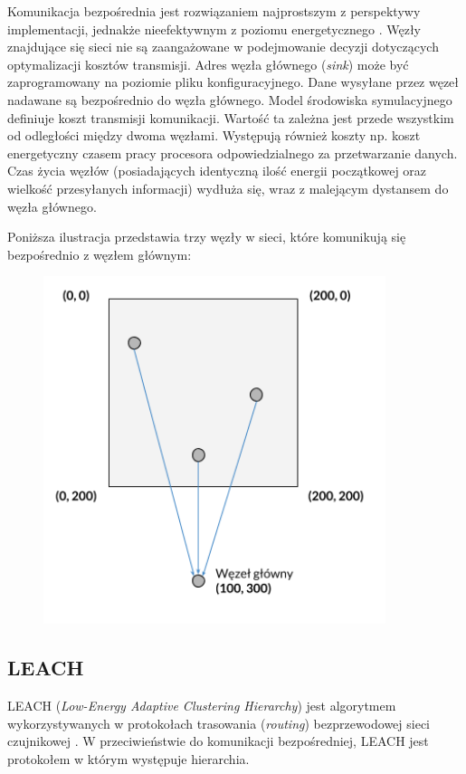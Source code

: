 \documentclass[a4paper,12pt,twoside,openany]{report}
\begin{document}
Komunikacja bezpośrednia jest rozwiązaniem najprostszym z perspektywy implementacji, jednakże nieefektywnym z poziomu energetycznego \cite{WSN-routing} \cite{Wiley-WSN}. 
Węzły znajdujące się sieci nie są zaangażowane w podejmowanie decyzji dotyczących optymalizacji kosztów transmisji. 
Adres węzła głównego (\textit{sink}) może być zaprogramowany na poziomie pliku konfiguracyjnego.
Dane wysyłane przez węzeł nadawane są bezpośrednio do węzła głównego.
Model środowiska symulacyjnego definiuje koszt transmisji komunikacji. Wartość ta zależna jest przede wszystkim od odległości między dwoma węzłami.
Występują również koszty np. koszt energetyczny czasem pracy procesora odpowiedzialnego za przetwarzanie danych.
Czas życia węzłów (posiadających identyczną ilość energii początkowej oraz wielkość przesyłanych informacji) wydłuża się, wraz z malejącym dystansem do węzła głównego.

Poniższa ilustracja przedstawia trzy węzły w sieci, które komunikują się bezpośrednio z węzłem głównym:

\begin{figure}[H]
 \centering
 \includegraphics[width=10cm]{images/komunikacja_bezposrednia.png}
\end{figure}

\subsection{LEACH}

LEACH (\textit{Low-Energy Adaptive Clustering Hierarchy}) jest algorytmem wykorzystywanych w protokołach trasowania (\textit{routing}) bezprzewodowej sieci czujnikowej \cite{Akyildiz}.
W przeciwieństwie do komunikacji bezpośredniej, LEACH jest protokołem w którym występuje hierarchia. 
\end{document}
